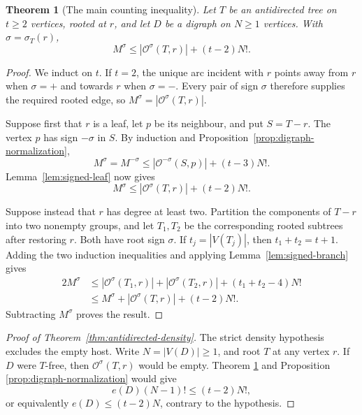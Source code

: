\documentclass[11pt]{article}
\numberwithin{equation}{section}
\newtheorem{theorem}{Theorem}[section]
\theoremstyle{definition}
\newcommand{\cO}{\mathcal O}
\begin{document}
\begin{theorem}[The main counting inequality]
\label{thm:antidirected-master}
Let $T$ be an antidirected tree on $t\geq2$ vertices, rooted at $r$, and
let $D$ be a digraph on $N\geq1$ vertices.  With
$\sigma=\sigma_T(r)$,
\begin{equation}
        M^\sigma
        \leq |\cO^\sigma(T,r)|+(t-2)N!.
        \label{eq:antidirected-master}
\end{equation}
\end{theorem}

\begin{proof}
We induct on $t$.  If $t=2$, the unique arc incident with $r$ points away
from $r$ when $\sigma=+$ and towards $r$ when $\sigma=-$.  Every pair of
sign $\sigma$ therefore supplies the required rooted edge, so
$M^\sigma=|\cO^\sigma(T,r)|$.

Suppose first that $r$ is a leaf, let $p$ be its neighbour, and put
$S=T-r$.  The vertex $p$ has sign $-\sigma$ in $S$.  By induction and
Proposition~\ref{prop:digraph-normalization},
\[
 M^\sigma=M^{-\sigma}
 \leq |\cO^{-\sigma}(S,p)|+(t-3)N!.
\]
Lemma~\ref{lem:signed-leaf} now gives
\[
 M^\sigma
 \leq |\cO^\sigma(T,r)|+(t-2)N!.
\]

Suppose instead that $r$ has degree at least two.  Partition the components
of $T-r$ into two nonempty groups, and let $T_1,T_2$ be the corresponding
rooted subtrees after restoring $r$.  Both have root sign $\sigma$.  If
$t_j=|V(T_j)|$, then $t_1+t_2=t+1$.  Adding the two induction inequalities
and applying Lemma~\ref{lem:signed-branch} gives
\[
\begin{aligned}
 2M^\sigma
   &\leq |\cO^\sigma(T_1,r)|+|\cO^\sigma(T_2,r)|
          +(t_1+t_2-4)N!\\
   &\leq M^\sigma+|\cO^\sigma(T,r)|
          +(t-2)N!.
\end{aligned}
\]
Subtracting $M^\sigma$ proves the result.
\end{proof}

\begin{proof}[Proof of Theorem~\ref{thm:antidirected-density}]
The strict density hypothesis excludes the empty host.  Write
$N=|V(D)|\geq1$, and root $T$ at any vertex $r$.  If $D$ were
$T$-free, then $\cO^\sigma(T,r)$ would be empty.  Theorem
\ref{thm:antidirected-master} and Proposition
\ref{prop:digraph-normalization} would give
\[
        e(D)(N-1)!\leq(t-2)N!,
\]
or equivalently $e(D)\leq(t-2)N$, contrary to the hypothesis.
\end{proof}
\end{document}
